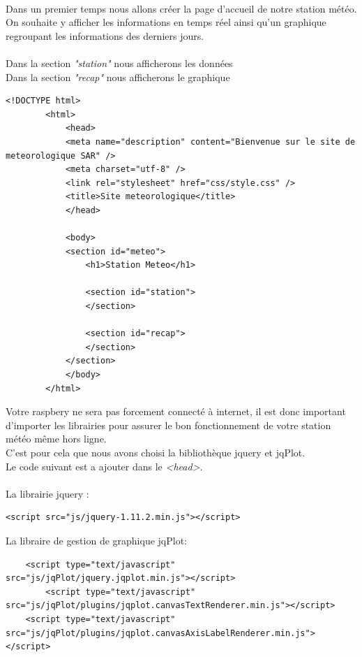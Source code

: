 \documentclass[a4paper, titlepage, oneside, 12pt]{article}%
\begin{document}
\paragraph{}
Dans un premier temps nous allons créer la page d’accueil de notre station météo.
On souhaite y afficher les informations en temps réel ainsi qu'un graphique regroupant les informations des derniers jours.\\ \\ 
Dans la section \textit{"station"} nous afficherons les données\\
Dans la section \textit{"recap"} nous afficherons le graphique\\


\begin{lstlisting}
<!DOCTYPE html>
		<html>
			<head>
			<meta name="description" content="Bienvenue sur le site de meteorologique SAR" />
			<meta charset="utf-8" />
			<link rel="stylesheet" href="css/style.css" />
			<title>Site meteorologique</title>
			</head>

			<body>
			<section id="meteo">
				<h1>Station Meteo</h1>
			
				<section id="station">
				</section>
				
				<section id="recap">				
				</section>
			</section>
			</body>
		</html>
\end{lstlisting}

Votre raspbery ne sera pas forcement connecté à internet, il est donc important d'importer les librairies pour assurer le bon fonctionnement de votre station météo même hors ligne.\\
C'est pour cela que nous avons choisi la bibliothèque jquery et jqPlot.\\ Le code suivant est a ajouter dans le \textit{<head>}.
\paragraph{}
La librairie jquery :
\begin{lstlisting}
<script src="js/jquery-1.11.2.min.js"></script>	
\end{lstlisting}
La libraire de gestion de graphique jqPlot:
\begin{lstlisting}
	<script type="text/javascript" src="js/jqPlot/jquery.jqplot.min.js"></script>	
    	<script type="text/javascript" src="js/jqPlot/plugins/jqplot.canvasTextRenderer.min.js"></script>
	<script type="text/javascript" src="js/jqPlot/plugins/jqplot.canvasAxisLabelRenderer.min.js"></script>	
\end{lstlisting}
\end{document}
